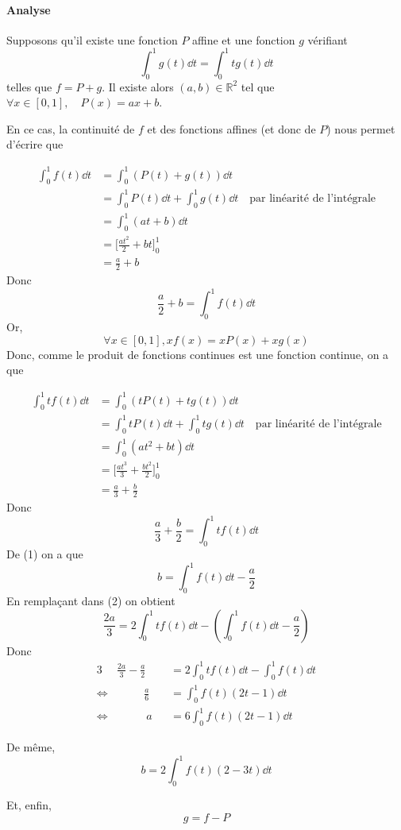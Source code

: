 \documentclass[10pt]{article}
\def\R{\mathbb R}
\begin{document}
\begin{enumerate}
        \paragraph{Analyse} Supposons qu'il existe une fonction $P$ affine et une fonction $g$ vérifiant \[\int_0^1g(t)\dd t = \int_0^1tg(t)\dd t\] telles que $f=P+g$. Il existe alors $(a,b)\in\R^2$ tel que $\forall x\in[0,1],\quad P(x)=ax+b$.


        En ce cas, la continuité de $f$ et des fonctions affines (et donc de $P$) nous permet d'écrire que

        \begin{align*}
            \int_0^1f(t)\dd t &= \int_0^1(P(t)+g(t))\dd t\\
                              &= \int_0^1P(t)\dd t +\int_0^1g(t)\dd t\quad \text{par linéarité de l'intégrale}\\
                              &= \int_0^1(at+b)\dd t\\
                              &=\Big[\frac{at^2}2+bt\Big]_0^1\\
                              &=\frac a2+b
        \end{align*}
        Donc \[\frac a2+b=\int_0^1f(t)\dd t \tag{1}\]
        Or, \[\forall x\in[0,1], xf(x)=xP(x)+xg(x)\]
        Donc, comme le produit de fonctions continues est une fonction continue, on a que

        \begin{align*}
            \int_0^1tf(t)\dd t &= \int_0^1(tP(t)+tg(t))\dd t\\
                              &= \int_0^1tP(t)\dd t +\int_0^1tg(t)\dd t\quad \text{par linéarité de l'intégrale}\\
                              &= \int_0^1(at^2+bt)\dd t\\
                              &=\Big[\frac{at^3}3+\frac{bt^2}2\Big]_0^1\\
                              &=\frac a3+\frac b2
        \end{align*}
        Donc \[\frac a3+\frac b2=\int_0^1tf(t)\dd t\tag{2}\]
        De (1) on a que \[b=\int_0^1f(t)\dd t - \frac a2\]
        En remplaçant dans (2) on obtient \[\frac {2a}3=2\int_0^1tf(t)\dd t - \left(\int_0^1f(t)\dd t - \frac a2\right)\]
        Donc 
        \begin{alignat*}{3}
            &\frac {2a}3-\frac a2 & &= 2\int_0^1tf(t)\dd t - \int_0^1f(t)\dd t\\
            \Leftrightarrow & \qquad\ \ \frac a6  & &= \int_0^1f(t)(2t-1)\dd t\\
            \Leftrightarrow &\qquad\ \ \ a  & &= 6\int_0^1f(t)(2t-1)\dd t
        \end{alignat*}

        De même, \[b=2\int_0^1f(t)(2-3t)\dd t\]

        Et, enfin, \[g=f-P\]
    \end{enumerate}
\end{document}
